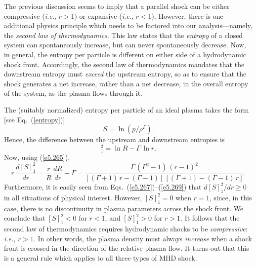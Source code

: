 The previous discussion seems to imply that a parallel shock can be either compressive ({\em i.e.}, $r>1$) or expansive ({\em i.e.}, $r<1$). However, there is one
additional physics principle which needs to be factored into
our analysis---namely, the {\em second law of thermodynamics}. This law states that  the {\em entropy}\/ of a closed system can spontaneously increase,
but can never spontaneously decrease. Now, in general, the entropy per particle is different on either side of a hydrodynamic shock front. Accordingly, the second law of thermodynamics
mandates that the downstream entropy  must {\em exceed}\/ the upstream
entropy, so as to ensure that the shock generates a net increase, rather
than a net decrease, in the overall entropy of the system, as the plasma flows through it.

The (suitably normalized) entropy per particle of an ideal plasma takes the form [see Eq.~(\ref{entropy})]
\begin{equation}
S = \ln(p/\rho^{\Gamma}).
\end{equation}
Hence, the difference between the upstream and downstream entropies is
\begin{equation}
[S]^2_1 =\ln R - \Gamma\,\ln r.
\end{equation}
Now, using (\ref{e5.265}), 
\begin{equation}
r\,\frac{d[S]_1^2}{dr} = \frac{r}{R}\,\frac{dR}{dr}-\Gamma
= \frac{\Gamma\,(\Gamma^2-1)\,(r-1)^2}{[(\Gamma+1)\,r-(\Gamma-1)]\,[(\Gamma+1)-(\Gamma-1)\,r]}.
\end{equation}
Furthermore, it is easily seen from  Eqs.~(\ref{e5.267})--(\ref{e5.269}) that $d[S]_1^2/dr\geq 0$ in all situations of physical interest. However, $[S]_1^2=0$
when $r=1$, since, in this case, there is no discontinuity in plasma parameters across the shock front. We conclude that $[S]_1^2<0$ for $r<1$, and
$[S]_1^2>0$ for $r>1$. It follows that  the second law of thermodynamics 
requires hydrodynamic shocks to be {\em compressive}: {\em i.e.}, $r>1$. In other words, the
plasma density must always {\em increase}\/ when a shock front
is crossed in the direction of the relative plasma flow. It turns out that this
is a general rule which applies to all three types of MHD shock.

